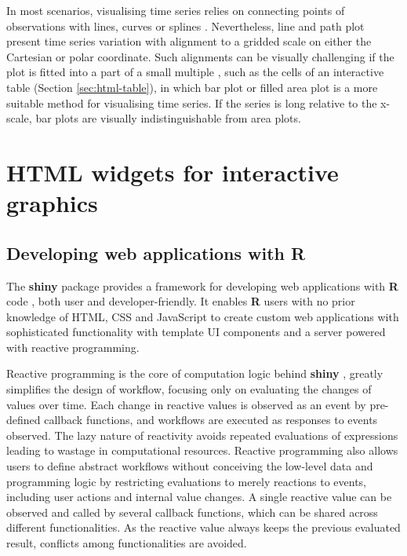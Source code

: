 \documentclass{aucklandthesis}
\begin{document}
In most scenarios, visualising time series relies on connecting points of observations with lines, curves or splines \autocite{dataviz-ts}. Nevertheless, line and path plot present time series variation with alignment to a gridded scale on either the Cartesian or polar coordinate. Such alignments can be visually challenging if the plot is fitted into a part of a small multiple \autocite{tufte}, such as the cells of an interactive table (Section \ref{sec:html-table}), in which bar plot or filled area plot is a more suitable method for visualising time series. If the series is long relative to the x-scale, bar plots are visually indistinguishable from area plots.

\hypertarget{html-widgets-for-interactive-graphics}{%
\section{HTML widgets for interactive graphics}\label{html-widgets-for-interactive-graphics}}

\hypertarget{developing-web-applications-with-r}{%
\subsection{Developing web applications with R}\label{developing-web-applications-with-r}}

The \textbf{shiny} package \autocite{shiny} provides a framework for developing web applications with \textbf{R} code \autocite{R2021}, both user and developer-friendly. It enables \textbf{R} users with no prior knowledge of HTML, CSS and JavaScript to create custom web applications with sophisticated functionality with template UI components and a server powered with reactive programming.

Reactive programming is the core of computation logic behind \textbf{shiny} \autocite{mshiny}, greatly simplifies the design of workflow, focusing only on evaluating the changes of values over time. Each change in reactive values is observed as an event by pre-defined callback functions, and workflows are executed as responses to events observed. The lazy nature of reactivity avoids repeated evaluations of expressions leading to wastage in computational resources. Reactive programming also allows users to define abstract workflows without conceiving the low-level data and programming logic by restricting evaluations to merely reactions to events, including user actions and internal value changes. A single reactive value can be observed and called by several callback functions, which can be shared across different functionalities. As the reactive value always keeps the previous evaluated result, conflicts among functionalities are avoided.
\end{document}
